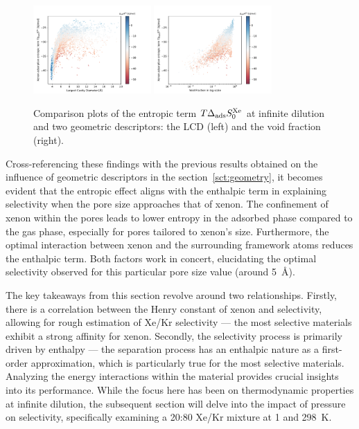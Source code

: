 \documentclass[main.tex]{subfiles}
\begin{document}
\begin{figure}[ht]
  \centering
  \includegraphics[width=0.4\textwidth]{figures/2-thermo/Scatterplot_entropy_lcd.pdf}
  \includegraphics[width=0.4\textwidth]{figures/2-thermo/Scatterplot_entropy_vf.pdf}
  \caption{Comparison plots of the entropic term $T\Delta_{\text{ads}}S^{\text{Xe}}_{\text{0}}$ at infinite dilution and two geometric descriptors: the LCD (left) and the void fraction (right).}\label{fgr:entropy_geometry}
\end{figure}

Cross-referencing these findings with the previous results obtained on the influence of geometric descriptors in the section~\ref{sct:geometry}, it becomes evident that the entropic effect aligns with the  enthalpic term in explaining selectivity when the pore size approaches that of xenon. The confinement of xenon within the pores leads to lower entropy in the adsorbed phase compared to the gas phase, especially for pores tailored to xenon's size. Furthermore, the optimal interaction between xenon and the surrounding framework atoms reduces the enthalpic term. Both factors work in concert, elucidating the optimal selectivity observed for this particular pore size value (around \SI{5}{\angstrom}). 

The key takeaways from this section revolve around two relationships. Firstly, there is a correlation between the Henry constant of xenon and selectivity, allowing for rough estimation of Xe/Kr selectivity --- the most selective materials exhibit a strong affinity for xenon. Secondly, the selectivity process is primarily driven by enthalpy --- the separation process has an enthalpic nature as a first-order approximation, which is particularly true for the most selective materials. Analyzing the energy interactions within the material provides crucial insights into its performance. While the focus here has been on thermodynamic properties at infinite dilution, the subsequent section will delve into the impact of pressure on selectivity, specifically examining a 20:80 Xe/Kr mixture at \SI{1}{\atm} and \SI{298}{\kelvin}. 
\end{document}
